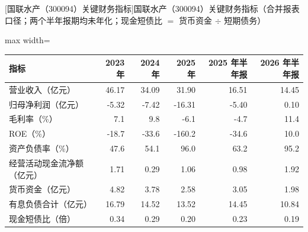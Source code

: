 \begin{center}\small\setlength{\tabcolsep}{3.4pt}
[国联水产（300094）关键财务指标]{国联水产（300094）关键财务指标（合并报表口径；两个半年报期均未年化；现金短债比 $=$ 货币资金 $\div$ 短期债务）}
\begin{adjustbox}{max width=\textwidth}
\begin{tabular}{@{}lrrrrr@{}}
\toprule
指标 & 2023 年 & 2024 年 & 2025 年 & 2025 年半年报 & 2026 年半年报 \\
\midrule
营业收入（亿元） & 46.17 & 34.09 & 31.90 & 16.51 & 14.45 \\
归母净利润（亿元） & -5.32 & -7.42 & -16.31 & -5.40 & 0.10 \\
毛利率（\%） & 7.1 & 9.8 & -6.1 & -4.7 & 11.4 \\
ROE（\%） & -18.7 & -33.6 & -160.2 & -34.6 & 10.0 \\
资产负债率（\%） & 47.6 & 54.1 & 96.0 & 63.2 & 95.2 \\
经营活动现金流净额（亿元） & 1.71 & 0.29 & 1.06 & 0.98 & 1.92 \\
货币资金（亿元） & 4.82 & 3.78 & 2.58 & 3.05 & 1.98 \\
有息负债合计（亿元） & 16.79 & 14.52 & 13.52 & 14.45 & 10.84 \\
现金短债比（倍） & 0.34 & 0.29 & 0.20 & 0.23 & 0.19 \\
\bottomrule
\end{tabular}
\end{adjustbox}
\end{center}

